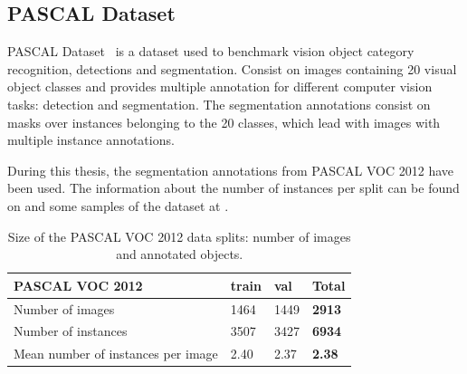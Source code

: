 \subsection{PASCAL Dataset}

PASCAL Dataset~\cite{Everingham10} is a dataset used to benchmark vision object category recognition, detections and segmentation.
Consist on images containing 20 visual object classes and provides multiple annotation for different computer vision tasks: detection and segmentation.
The segmentation annotations consist on masks over instances belonging to the 20 classes, which lead with images with multiple instance annotations.

During this thesis, the segmentation annotations from PASCAL VOC 2012 have been used. The information about the number of instances per split can be found on  and some samples of the dataset at .

\begin{table}[h]
  \centering
  \begin{tabular}{l|lll}
  PASCAL VOC 2012                    & train & val  & \textbf{Total} \\
  \hline
  Number of images                   & 1464  & 1449 & \textbf{2913}  \\
  Number of instances                & 3507  & 3427 & \textbf{6934}  \\
  Mean number of instances per image & 2.40  & 2.37 & \textbf{2.38}  \\
  \end{tabular}
  \caption{Size of the PASCAL VOC 2012 data splits: number of images and annotated objects.}
  \label{tab:pascal}
\end{table}


